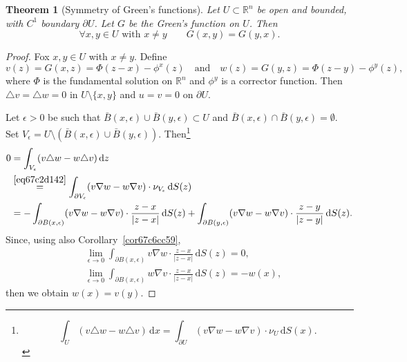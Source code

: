 \documentclass[a4paper,9pt]{amsart}
\newcommand{\R}{\mathbb{R}}	%
\newcommand{\did}{\,\mathrm{d}}	%
\newcommand{\de}{\partial}		%
\newcommand{\laplacian}{\triangle}
\newcommand{\grad}{\nabla}
\theoremstyle{plain}
\newtheorem{theorem}[proposition]{Theorem}
\theoremstyle{definition}
\theoremstyle{remark}
\begin{document}
\begin{theorem}[Symmetry of Green's functions]\label{thm67c2ce50}
	Let $U\subset\R^n$ be open and bounded, with $C^1$ boundary $\de U$.
	Let $G$ be the Green's function on $U$.
	Then
	\begin{equation}\label{eq67c2ceac}
		\forall x,y\in U\text{ with } x\neq y
		\qquad
		G(x,y) = G(y,x) .
	\end{equation}
\end{theorem}
\begin{proof}
	Fox $x,y\in U$ with $x\neq y$.
	Define
	\begin{equation}
		v(z) = G(x,z) = \Phi(z-x) - \phi^x(z) 
		\quad\text{and}\quad
		w(z) = G(y,z) = \Phi(z-y) - \phi^y(z) ,
	\end{equation}
	where $\Phi$ is the fundamental solution on $\R^n$ and $\phi^y$ is a corrector function.
	Then $\laplacian v = \laplacian w = 0 $ in $U\setminus\{x,y\}$ and $u=v=0$ on $\de U$.
	
	Let $\epsilon>0$ be such that $\bar B(x,\epsilon)\cup \bar B(y,\epsilon)\subset U$ and $\bar B(x,\epsilon)\cap \bar B(y,\epsilon) = \emptyset$.
	Set $V_\epsilon = U \setminus ( \bar B(x,\epsilon)\cup \bar B(y,\epsilon) )$.
	Then\footnote{
\begin{equation}\label{eq67c2d142}
	\int_U (v\laplacian w - w \laplacian v) \did x
	= \int_{\de U} (v\grad w - w\grad v)\cdot \nu_U \did S(x) .
\end{equation}
}
	\begin{align*}
		0
		&= \int_{V_\epsilon} (v\laplacian w - w \laplacian v) \did z \\
		&\overset{\eqref{eq67c2d142}}= \int_{\de V_\epsilon} (v\grad w - w\grad v)\cdot \nu_{V_\epsilon} \did S(z) \\
		&= -\int_{\de B(x,\epsilon)} (v\grad w - w\grad v)\cdot \frac{z-x}{|z-x|} \did S(z) 
			+ \int_{\de B(y,\epsilon)} (v\grad w - w\grad v)\cdot \frac{z-y}{|z-y|} \did S(z) . \\
	\end{align*}
	Since, using also Corollary~\ref{cor67c6cc59},
	\begin{equation}\label{eq67c2d634}
	\begin{aligned}
		&\lim_{\epsilon\to 0}
		\int_{\de B(x,\epsilon)} v\grad w \cdot \frac{z-x}{|z-x|} \did S(z)
		= 0 ,\\
		&\lim_{\epsilon\to 0}
		\int_{\de B(x,\epsilon)}  w\grad v\cdot \frac{z-x}{|z-x|} \did S(z)
		= - w(x) ,
	\end{aligned}
	\end{equation}
	then we obtain $w(x) = v(y)$.
\end{proof}
\end{document}
